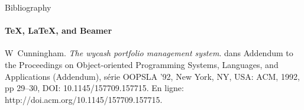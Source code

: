\documentclass{beamer}
\begin{document}
		\begin{frame}[label=bibliography]{Bibliography}
		\framesubtitle{\TeX, \LaTeX, and Beamer}
		\begin{thebibliography}{9}
			W~Cunningham.
			\emph{The wycash portfolio management system}.
			dans Addendum to the Proceedings on Object-oriented Programming Systems, Languages, and Applications (Addendum), s\'{e}rie OOPSLA ’92, New York, NY, USA: ACM, 1992, pp 29–30, DOI: 10.1145/157709.157715. En ligne: http://doi.acm.org/10.1145/157709.157715.
			\end{thebibliography}
		\end{frame}
	
\end{document}
